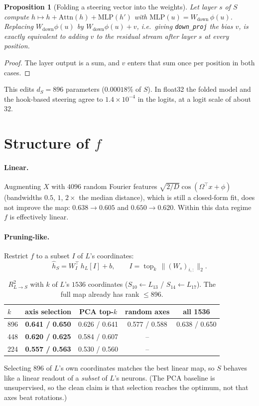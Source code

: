 \documentclass[10pt]{article}
\newtheorem{proposition}{Proposition}
\begin{document}
\begin{proposition}[Folding a steering vector into the weights]
Let layer $s$ of $S$ compute $h \mapsto h + \mathrm{Attn}(h) + \mathrm{MLP}(h')$ with
$\mathrm{MLP}(u) = W_{\mathrm{down}}\,\phi(u)$. Replacing $W_{\mathrm{down}}\phi(u)$ by
$W_{\mathrm{down}}\phi(u) + v$, i.e.\ giving \texttt{down\_proj} the bias $v$, is exactly equivalent to
adding $v$ to the residual stream after layer $s$ at every position.
\end{proposition}
\begin{proof}
The layer output is a sum, and $v$ enters that sum once per position in both cases.
\end{proof}
\noindent This edits $d_S = 896$ parameters ($0.00018\%$ of $S$). In float32 the folded model and the
hook-based steering agree to $1.4\times10^{-4}$ in the logits, at a logit scale of about $32$.

\section{Structure of $f$}

\paragraph{Linear.} Augmenting $X$ with $4096$ random Fourier features $\sqrt{2/D}\cos(\Omega^\top x + \phi)$
(bandwidths $0.5$, $1$, $2\times$ the median distance), which is still a closed-form fit, does not improve the
map: $0.638 \to 0.605$ and $0.650 \to 0.620$. Within this data regime $f$ is effectively linear.

\paragraph{Pruning-like.} Restrict $f$ to a subset $I$ of $L$'s coordinates:
\begin{equation}
\hat h_S = W_{I}^{\top}\, h_L[I] + b, \qquad I = \operatorname{top}_{k}\, \lVert (W_s)_{i,:}\rVert_2 .
\end{equation}
\begin{table}[H]
\centering
\caption{$R^2_{L\to S}$ with $k$ of $L$'s $1536$ coordinates ($S_{10}\leftarrow L_{13}$ / $S_{14}\leftarrow L_{17}$).
The full map already has rank $\le 896$.}
\begin{tabular}{lcccc}
\toprule
$k$ & axis selection & PCA top-$k$ & random axes & all 1536 \\
\midrule
896 & \textbf{0.641 / 0.650} & 0.626 / 0.641 & 0.577 / 0.588 & 0.638 / 0.650 \\
448 & \textbf{0.620 / 0.625} & 0.584 / 0.607 & -- & \\
224 & \textbf{0.557 / 0.563} & 0.530 / 0.560 & -- & \\
\bottomrule
\end{tabular}
\end{table}
Selecting $896$ of $L$'s own coordinates matches the best linear map, so $S$ behaves like a linear readout
of a \emph{subset} of $L$'s neurons. (The PCA baseline is unsupervised, so the clean claim is that
selection reaches the optimum, not that axes beat rotations.)
\end{document}
